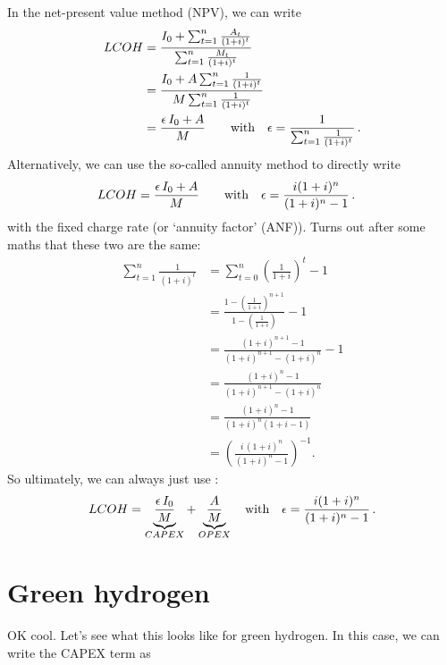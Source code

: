 \documentclass[%
 draft,
 aapm,
 mph,%
 amsmath,amssymb,
 reprint,%
]{revtex4-2}
\begin{document}
In the net-present value method (NPV), we can write
\begin{align}
    LCOH &= \frac{I_0 + \sum_{t=1}^{n} \frac{A_t}{(1+i)^t}}{\sum_{t=1}^{n} \frac{M_t}{(1+i)^t}}\\
         &= \frac{I_0 + A \sum_{t=1}^{n} \frac{1}{(1+i)^t}}{M \sum_{t=1}^{n} \frac{1}{(1+i)^t}}\\
         &= \frac{\epsilon \, I_0 + A}{M} \qquad \text{with} \quad \epsilon = \frac{1}{\sum_{t=1}^{n} \frac{1}{(1+i)^t}} \,.
\end{align}
Alternatively, we can use the so-called annuity method to directly write
\begin{align}
    LCOH &= \frac{\epsilon \, I_0 + A}{M} \qquad \text{with} \quad \epsilon = \frac{i(1+i)^n}{(1+i)^n-1} \,. \label{eq:lcoh_economics}
\end{align}
with the fixed charge rate (or `annuity factor' (ANF)). Turns out after some maths that these two are the same:
\begin{align}
    \sum_{t=1}^{n} \frac{1}{(1+i)^t} &= \sum_{t=0}^{n} \left(\frac{1}{1+i}\right)^t - 1 \\
                                     &= \frac{1-\left(\frac{1}{1+i}\right)^{n+1}}{1-\left(\frac{1}{1+i}\right)} - 1 \\
                                     &= \frac{(1+i)^{n+1} - 1}{(1+i)^{n+1} - (1+i)^n} - 1 \\
                                     &= \frac{(1+i)^n - 1}{(1+i)^{n+1} - (1+i)^n} \\
                                     &= \frac{(1+i)^n - 1}{(1+i)^n (1+i-1)} \\
                                     &= \left( \frac{i \, (1+i)^n}{(1+i)^n - 1} \right)^{-1}.
\end{align}
So ultimately, we can always just use :
\begin{equation}
    LCOH = \underbrace{\frac{\epsilon \, I_0}{M}}_{CAPEX} + \underbrace{\frac{A}{M}}_{OPEX} \quad \text{with} \quad \epsilon = \frac{i(1+i)^n}{(1+i)^n-1} \,.
\end{equation}


\section{Green hydrogen}
OK cool. Let's see what this looks like for green hydrogen. In this case, we can write the CAPEX term as
\end{document}
